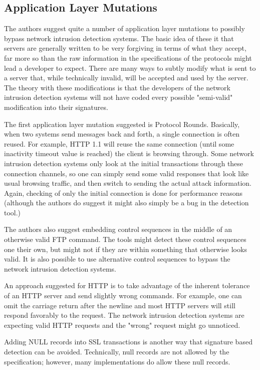\documentclass{reading_glasses}
\begin{document}
\subsection{Application Layer Mutations}
The authors suggest quite a number of application layer mutations to possibly bypass network intrusion detection systems.  The basic idea of these it that servers are generally written to be very forgiving in terms of what they accept, far more so than the raw information in the specifications of the protocols might lead a developer to expect.  There are many ways to subtly modify what is sent to a server that, while technically invalid, will be accepted and used by the server.  The theory with these modifications is that the developers of the network intrusion detection systems will not have coded every possible "semi-valid" modification into their signatures. \cite{vigna2004testing}

The first application layer mutation suggested is Protocol Rounds.  Basically, when two systems send messages back and forth, a single connection is often reused.  For example, HTTP 1.1 will reuse the same connection (until some inactivity timeout value is reached) the client is browsing through.  Some network intrusion detection systems only look at the initial transactions through these connection channels, so one can simply send some valid responses that look like usual browsing traffic, and then switch to sending the actual attack information.  Again, checking of only the initial connection is done for performance reasons (although the authors do suggest it might also simply be a bug in the detection tool.) \cite{vigna2004testing}

The authors also suggest embedding control sequences in the middle of an otherwise valid FTP command.  The tools might detect these control sequences one their own, but might not if they are within something that otherwise looks valid.  It is also possible to use alternative control sequences to bypass the network intrusion detection systems.  \cite{vigna2004testing}

An approach suggested for HTTP is to take advantage of the inherent tolerance of an HTTP server and send slightly wrong commands.  For example, one can omit the carriage return after the newline and most HTTP servers will still respond favorably to the request.  The network intrusion detection systems are expecting valid HTTP requests and the "wrong" request might go unnoticed.  \cite{vigna2004testing}

Adding NULL records into SSL transactions is another way that signature based detection can be avoided.  Technically, null records are not allowed by the specification; however, many implementations do allow these null records. \cite{vigna2004testing}
\end{document}

